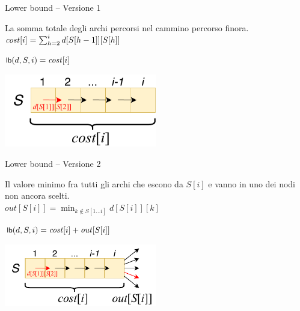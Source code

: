 \begin{frame}{Lower bound -- Versione 1}

\vspace{-9pt}
\begin{myboxtitle}
La somma totale degli archi percorsi nel cammino percorso finora.\\[6pt]
\alert{$
  \mathit{cost}[i] = \sum_{h=2}^i d[S[h-1]][S[h]]
$}
\end{myboxtitle}	

\begin{myboxtitle}
\alert{$
  \textsf{{\small lb}}(d, S, i) = \mathit{cost}[i]
$}
\end{myboxtitle}	

\includegraphics[width=0.5\textwidth]{lower-bound0a.pdf}

\end{frame}

\begin{frame}{Lower bound -- Versione 2}

\vspace{-9pt}
\begin{myboxtitle}
Il valore minimo fra tutti gli archi che escono da $S[i]$ e vanno in uno dei nodi non ancora scelti.\\[6pt]
\alert{$
\mathit{out}[S[i]] = \min_{k \notin S[1 \ldots i]} d[S[i]][k]
$}
\end{myboxtitle}	

\begin{myboxtitle}
\alert{$
  \textsf{{\small lb}}(d, S, i) = \mathit{cost}[i] + \mathit{out}[S[i]]
$}
\end{myboxtitle}	

\includegraphics[width=0.5\textwidth]{lower-bound0b.pdf}

\end{frame}


